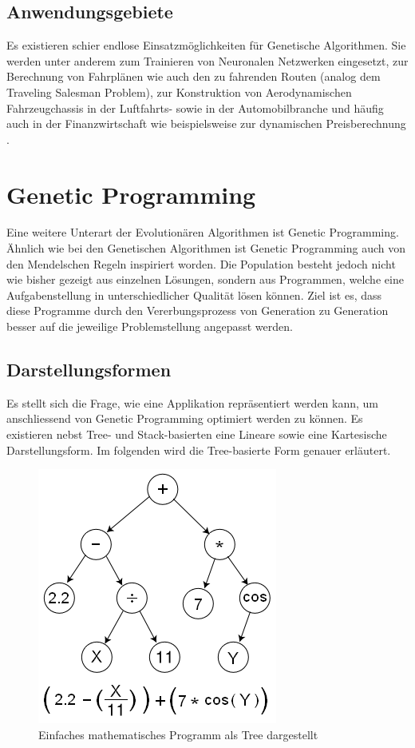 \subsection{Anwendungsgebiete}
Es existieren schier endlose Einsatzmöglichkeiten für Genetische Algorithmen. Sie werden unter anderem
zum Trainieren von Neuronalen Netzwerken eingesetzt, zur Berechnung von Fahrplänen wie auch den zu fahrenden
Routen (analog dem Traveling Salesman Problem), zur Konstruktion von Aerodynamischen Fahrzeugchassis in
der Luftfahrts- sowie in der Automobilbranche und häufig auch in der Finanzwirtschaft wie beispielsweise
zur dynamischen Preisberechnung \cite{Tut}.

\section{Genetic Programming}
Eine weitere Unterart der Evolutionären Algorithmen ist Genetic Programming. Ähnlich wie
bei den Genetischen Algorithmen ist Genetic Programming auch von den Mendelschen Regeln
inspiriert worden. Die Population besteht jedoch nicht wie bisher gezeigt aus einzelnen
Lösungen, sondern aus Programmen, welche eine Aufgabenstellung in unterschiedlicher
Qualität lösen können. Ziel ist es, dass diese Programme durch den Vererbungsprozess
von Generation zu Generation besser auf die jeweilige Problemstellung angepasst werden.
\cite{GenGP}

\subsection{Darstellungsformen}
Es stellt sich die Frage, wie eine Applikation repräsentiert werden kann, um anschliessend von
Genetic Programming optimiert werden zu können. Es existieren nebst Tree- und Stack-basierten
eine Lineare sowie eine Kartesische Darstellungsform. Im folgenden wird die Tree-basierte Form
genauer erläutert.

\begin{figure}[h!]
  \centering
  \includegraphics[scale=0.5]{resources/genetic_program_tree.png}
  \caption{Einfaches mathematisches Programm als Tree dargestellt \cite{Wiki01}}
  \label{fig:gp_tree}
\end{figure}

